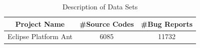 \documentclass[conference]{IEEEtran}
\begin{document}
\begin{table}[htbp]
\caption{Description of Data Sets}
\label{tab:DDSl}
\centering
\begin{tabular}{c|c|c}
\hline
\textbf{Project Name}  &  \textbf{\#Source Codes} & \textbf{\#Bug Reports}\\
\hline
{Eclipse Platform Ant} & {6085} & 11732\\
\hline
\end{tabular}
\centering
\end{table}


\begin{table}[htbp]
\caption{Performance of Bugloactor and proposed technique (rVSM+Simi+Co-Occerence)}
\label{tab:Performance1}
\centering
{}
\end{table}
\end{document}
